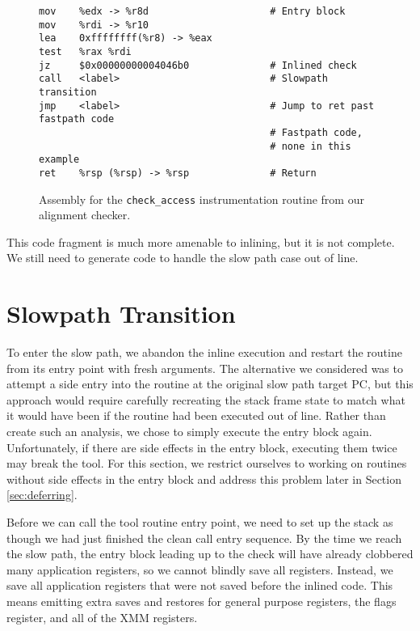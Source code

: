 \begin{figure}
\begin{verbatim}
mov    %edx -> %r8d                     # Entry block
mov    %rdi -> %r10
lea    0xffffffff(%r8) -> %eax
test   %rax %rdi
jz     $0x00000000004046b0              # Inlined check
call   <label>                          # Slowpath transition
jmp    <label>                          # Jump to ret past fastpath code
                                        # Fastpath code,
                                        # none in this example
ret    %rsp (%rsp) -> %rsp              # Return
\end{verbatim}
\caption{Assembly for the {\tt check\_access} instrumentation routine from our
alignment checker.}
\label{fig:alignment_fastpath}
\end{figure}

This code fragment is much more amenable to inlining, but it is not complete.
We still need to generate code to handle the slow path case out of line.

\section{Slowpath Transition}
\label{sec:slowpath_transition}

To enter the slow path, we abandon the inline execution and restart the routine
from its entry point with fresh arguments.  The alternative we considered was to
attempt a side entry into the routine at the original slow path target PC, but
this approach would require carefully recreating the stack frame state to match
what it would have been if the routine had been executed out of line.  Rather
than create such an analysis, we chose to simply execute the entry block again.
Unfortunately, if there are side effects in the entry block, executing them
twice may break the tool.  For this section, we restrict ourselves to working on
routines without side effects in the entry block and address this problem later
in Section \ref{sec:deferring}.

Before we can call the tool routine entry point, we need to set up the stack as
though we had just finished the clean call entry sequence.  By the time we reach
the slow path, the entry block leading up to the check will have already
clobbered many application registers, so we cannot blindly save all registers.
Instead, we save all application registers that were not saved before the
inlined code.  This means emitting extra saves and restores for general purpose
registers, the flags register, and all of the XMM registers.

